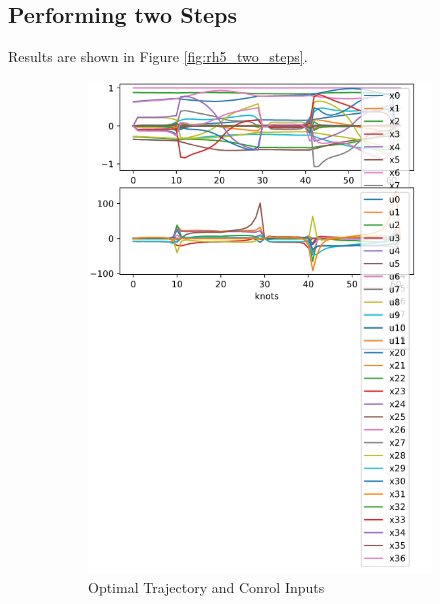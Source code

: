 \subsection{Performing two Steps}
Results are shown in Figure \ref{fig:rh5_two_steps}.
\begin{figure}[h!]
\centering
\begin{subfigure}{.4\textwidth}
  \centering
  \includegraphics[width=1\linewidth]{Media/Crocoddyl/RH5/2Steps/RH52Steps_Solution.png}
  \caption{Optimal Trajectory and Conrol Inputs}
\end{subfigure}%
\begin{subfigure}{.4\textwidth}
  \centering

\end{subfigure}
\end{figure}
